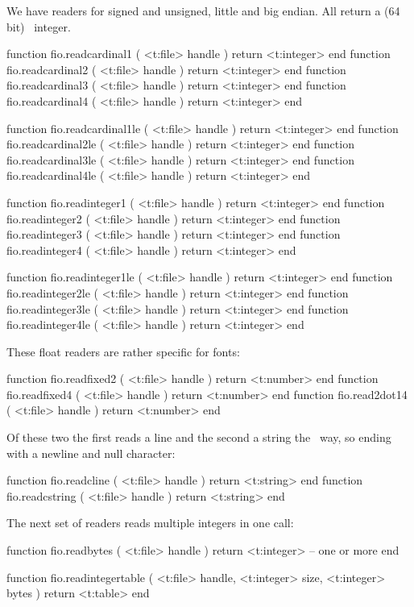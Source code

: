 We have readers for signed and unsigned, little and big endian. All return a (64
bit) \LUA\ integer.

\starttyping[option=LUA]
function fio.readcardinal1 ( <t:file> handle ) return <t:integer> end
function fio.readcardinal2 ( <t:file> handle ) return <t:integer> end
function fio.readcardinal3 ( <t:file> handle ) return <t:integer> end
function fio.readcardinal4 ( <t:file> handle ) return <t:integer> end

function fio.readcardinal1le ( <t:file> handle ) return <t:integer> end
function fio.readcardinal2le ( <t:file> handle ) return <t:integer> end
function fio.readcardinal3le ( <t:file> handle ) return <t:integer> end
function fio.readcardinal4le ( <t:file> handle ) return <t:integer> end

function fio.readinteger1 ( <t:file> handle ) return <t:integer> end
function fio.readinteger2 ( <t:file> handle ) return <t:integer> end
function fio.readinteger3 ( <t:file> handle ) return <t:integer> end
function fio.readinteger4 ( <t:file> handle ) return <t:integer> end

function fio.readinteger1le ( <t:file> handle ) return <t:integer> end
function fio.readinteger2le ( <t:file> handle ) return <t:integer> end
function fio.readinteger3le ( <t:file> handle ) return <t:integer> end
function fio.readinteger4le ( <t:file> handle ) return <t:integer> end
\stoptyping

These float readers are rather specific for fonts:

\starttyping[option=LUA]
function fio.readfixed2 ( <t:file> handle ) return <t:number>  end
function fio.readfixed4 ( <t:file> handle ) return <t:number>  end
function fio.read2dot14 ( <t:file> handle ) return <t:number>  end
\stoptyping

Of these two the first reads a line and the second a string the \CCODE\ way, so
ending with a newline and null character:

\starttyping[option=LUA]
function fio.readcline   ( <t:file> handle ) return <t:string> end
function fio.readcstring ( <t:file> handle ) return <t:string> end
\stoptyping

The next set of readers reads multiple integers in one call:

\starttyping[option=LUA]
function fio.readbytes (
    <t:file> handle
)
    return <t:integer> -- one or more
end
\stoptyping

\starttyping[option=LUA]
function fio.readintegertable (
    <t:file>    handle,
    <t:integer> size,
    <t:integer> bytes
)
    return <t:table>
end

